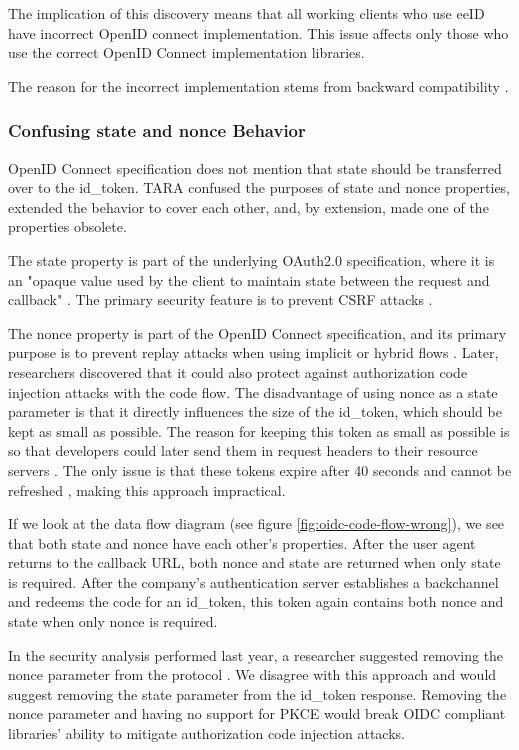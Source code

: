 The implication of this discovery means that all working clients who use eeID have incorrect OpenID connect implementation. This issue affects only those who use the correct OpenID Connect implementation libraries.

The reason for the incorrect implementation stems from backward compatibility \cite{tara-non-oidc-compliant}.

\subsubsection{Confusing state and nonce Behavior}

OpenID Connect specification does not mention that state should be transferred over to the id\_token. TARA confused the purposes of state and nonce properties, extended the behavior to cover each other, and, by extension, made one of the properties obsolete.

The state property is part of the underlying OAuth2.0 specification, where it is an "opaque value used by the client to maintain state between the request and callback" \cite{rfc6749}. The primary security feature is to prevent CSRF attacks \cite{rfc6749,ietf-oauth-security-topics-19}.

The nonce property is part of the OpenID Connect specification, and its primary purpose is to prevent replay attacks when using implicit or hybrid flows \cite{oidc}. Later, researchers discovered that it could also protect against authorization code injection attacks with the code flow. The disadvantage of using {nonce} as a state parameter is that it directly influences the size of the id\_token, which should be kept as small as possible. The reason for keeping this token as small as possible is so that developers could later send them in request headers to their resource servers \cite{rfc7519}. The only issue is that these tokens expire after 40 seconds and cannot be refreshed \cite{tara-technical}, making this approach impractical.

If we look at the data flow diagram (see figure \ref{fig:oidc-code-flow-wrong}), we see that both state and nonce have each other's properties. After the user agent returns to the callback URL, both {nonce} and {state} are returned when only {state} is required. After the company's authentication server establishes a backchannel and redeems the code for an id\_token, this token again contains both {nonce} and {state} when only {nonce} is required.

In the security analysis performed last year, a researcher suggested removing the nonce parameter from the protocol \cite{tara-security-arnis}. We disagree with this approach and would suggest removing the state parameter from the id\_token response. Removing the nonce parameter and having no support for PKCE would break OIDC compliant libraries' ability to mitigate authorization code injection attacks.

